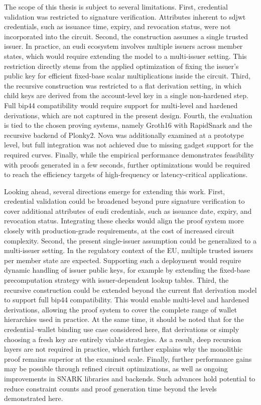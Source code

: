\medskip
The scope of this thesis is subject to several limitations. First, credential validation was restricted to signature verification. Attributes inherent to \acrshort{sdjwt} credentials, such as issuance time, expiry, and revocation status, were not incorporated into the circuit. Second, the construction assumes a single trusted issuer. In practice, an \acrshort{eudi} ecosystem involves multiple issuers across member states, which would require extending the model to a multi-issuer setting. This restriction directly stems from the applied optimization of fixing the issuer’s public key for efficient fixed-base scalar multiplications inside the circuit. Third, the recursive construction was restricted to a flat derivation setting, in which child keys are derived from the account-level key in a single non-hardened step. Full \acrshort{bip44} compatibility would require support for multi-level and hardened derivations, which are not captured in the present design. Fourth, the evaluation is tied to the chosen proving systems, namely Groth16 with RapidSnark and the recursive backend of Plonky2. Nova was additionally examined at a prototype level, but full integration was not achieved due to missing gadget support for the required curves. Finally, while the empirical performance demonstrates feasibility with proofs generated in a few seconds, further optimizations would be required to reach the efficiency targets of high-frequency or latency-critical applications.

\medskip
Looking ahead, several directions emerge for extending this work. First, credential validation could be broadened beyond pure signature verification to cover additional attributes of \acrshort{eudi} credentials, such as issuance date, expiry, and revocation status. Integrating these checks would align the proof system more closely with production-grade requirements, at the cost of increased circuit complexity. Second, the present single-issuer assumption could be generalized to a multi-issuer setting. In the regulatory context of the EU, multiple trusted issuers per member state are expected. Supporting such a deployment would require dynamic handling of issuer public keys, for example by extending the fixed-base precomputation strategy with issuer-dependent lookup tables. Third, the recursive construction could be extended beyond the current flat derivation model to support full \acrshort{bip44} compatibility. This would enable multi-level and hardened derivations, allowing the proof system to cover the complete range of wallet hierarchies used in practice. At the same time, it should be noted that for the credential–wallet binding use case considered here, flat derivations or simply choosing a fresh key are entirely viable strategies. As a result, deep recursion layers are not required in practice, which further explains why the monolithic proof remains superior at the examined scale. Finally, further performance gains may be possible through refined circuit optimizations, as well as ongoing improvements in SNARK libraries and backends. Such advances hold potential to reduce constraint counts and proof generation time beyond the levels demonstrated here.
